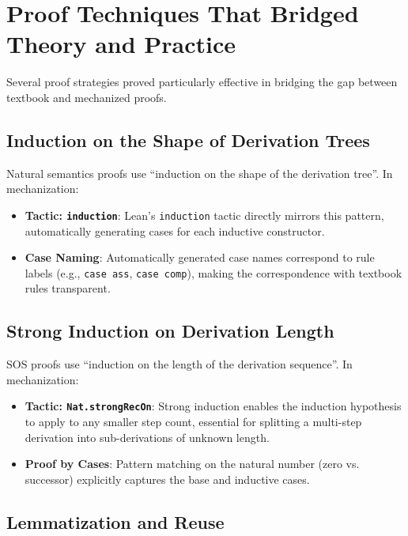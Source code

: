 %
%
%
\section{Proof Techniques That Bridged Theory and Practice}
\label{discussion:sec:techniques}

Several proof strategies proved particularly effective in bridging
the gap between textbook and mechanized proofs.

\subsection*{Induction on the Shape of Derivation Trees}

Natural semantics proofs use ``induction on the shape of the derivation tree''.
In mechanization:

\begin{itemize}
    \item \textbf{Tactic: \texttt{induction}}:
    Lean's \texttt{induction} tactic directly mirrors this pattern,
    automatically generating cases for each inductive constructor.
    
    \item \textbf{Case Naming}:
    Automatically generated case names correspond to rule labels
    (e.g., \texttt{case ass}, \texttt{case comp}), making the correspondence
    with textbook rules transparent.
\end{itemize}

\subsection*{Strong Induction on Derivation Length}

SOS proofs use ``induction on the length of the derivation sequence''.
In mechanization:

\begin{itemize}
    \item \textbf{Tactic: \texttt{Nat.strongRecOn}}:
    Strong induction enables the induction hypothesis to apply to any
    smaller step count, essential for splitting a multi-step derivation
    into sub-derivations of unknown length.
    
    \item \textbf{Proof by Cases}:
    Pattern matching on the natural number (zero vs. successor)
    explicitly captures the base and inductive cases.
\end{itemize}

\subsection*{Lemmatization and Reuse}

